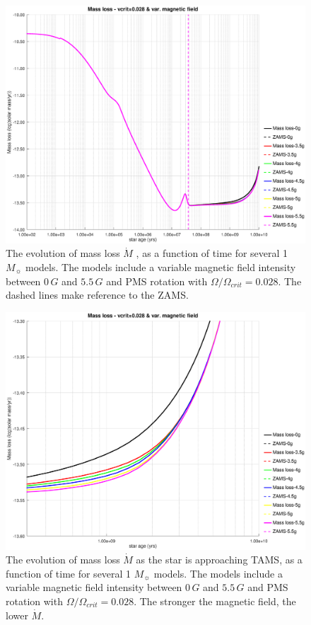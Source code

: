 \documentclass[fleqn,usenatbib]{mnras}
\begin{document}
\begin{figure}
	\includegraphics[trim = 30mm 15mm 20mm 15mm, clip,width=\columnwidth]{figures/mdot_vc_028_var_g.eps}
    \caption{The evolution of mass loss $\Dot{M}$ , as a function of time for several 1 $M_{\sun}$ models. The models include a variable magnetic field intensity between $0\,G$ and $5.5\,G$ and PMS rotation with $\Omega / \Omega_{crit}=0.028$. The dashed lines make reference to the ZAMS.}
    \label{fig:mdot_vc_028_var_b}
\end{figure}

\begin{figure}
	\includegraphics[trim = 30mm 15mm 20mm 15mm, clip,width=\columnwidth]{figures/mdot_vc_028_var_g_z1.eps}
    \caption{The evolution of mass loss $\Dot{M}$ as the star is approaching TAMS, as a function of time for several 1 $M_{\sun}$ models. The models include a variable magnetic field intensity between $0\,G$ and $5.5\,G$ and PMS rotation with $\Omega / \Omega_{crit}=0.028$. The stronger the magnetic field, the lower $\Dot{M}$.}
    \label{fig:mdot_vc_028_var_b_z1}
\end{figure}
\end{document}
